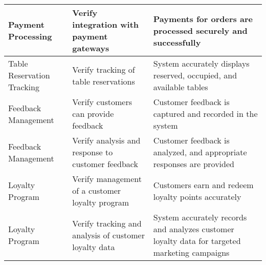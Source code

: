 \documentclass{article}
\begin{document}
\begin{longtable}{|l|p{7cm}|p{5cm}|}
\hline
Payment Processing & Verify integration with payment gateways & Payments for orders are processed securely and successfully \\
\hline
Table Reservation Tracking & Verify tracking of table reservations & System accurately displays reserved, occupied, and available tables \\
\hline
Feedback Management & Verify customers can provide feedback & Customer feedback is captured and recorded in the system \\
\hline
Feedback Management & Verify analysis and response to customer feedback & Customer feedback is analyzed, and appropriate responses are provided \\
\hline
Loyalty Program & Verify management of a customer loyalty program & Customers earn and redeem loyalty points accurately \\
\hline
Loyalty Program & Verify tracking and analysis of customer loyalty data & System accurately records and analyzes customer loyalty data for targeted marketing campaigns \\
\hline

\end{longtable}
    
\end{document}
